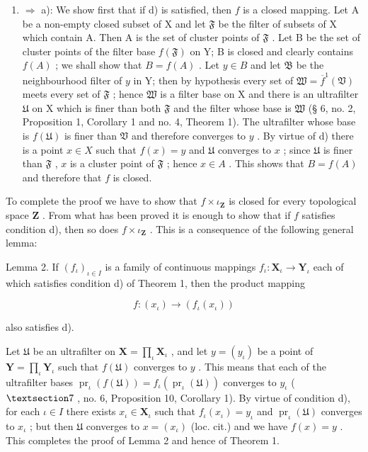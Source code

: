 \begin{enumerate}
\def\labelenumi{\alph{enumi})}
\setcounter{enumi}{3}
\tightlist
\item
  \(\Longrightarrow\) a): We show first that if d) is satisfied, then \(f\) is a closed mapping. Let A be a non-empty closed subset of X and let \(\mathfrak{F}\) be the filter of subsets of X which contain A. Then A is the set of cluster points of \(\mathfrak{F}\) . Let B be the set of cluster points of the filter base \(f(\mathfrak{F})\) on Y; B is closed and clearly contains \(f(A)\) ; we shall show that \(B = f(A)\) . Let \(y \in B\) and let \(\mathfrak{B}\) be the neighbourhood filter of \(y\) in Y; then by hypothesis every set of \(\mathfrak{W} = \overline{f}^{1}(\mathfrak{V})\) meets every set of \(\mathfrak{F}\) ; hence \(\mathfrak{W}\) is a filter base on X and there is an ultrafilter \(\mathfrak{U}\) on X which is finer than both \(\mathfrak{F}\) and the filter whose base is \(\mathfrak{W}\) (§ 6, no. 2, Proposition 1, Corollary 1 and no. 4, Theorem 1). The ultrafilter whose base is \(f(\mathfrak{U})\) is finer than \(\mathfrak{V}\) and therefore converges to \(y\) . By virtue of d) there is a point \(x \in X\) such that \(f(x) = y\) and \(\mathfrak{U}\) converges to \(x\) ; since \(\mathfrak{U}\) is finer than \(\mathfrak{F}\) , \(x\) is a cluster point of \(\mathfrak{F}\) ; hence \(x \in A\) . This shows that \(B = f(A)\) and therefore that \(f\) is closed.
\end{enumerate}

To complete the proof we have to show that \(f \times \iota_{\mathbf{Z}}\) is closed for every topological space \(\mathbf{Z}\) . From what has been proved it is enough to show that if \(f\) satisfies condition d), then so does \(f \times \iota_{\mathbf{Z}}\) . This is a consequence of the following general lemma:

Lemma 2. If \((f_{\iota})_{\iota\in I}\) is a family of continuous mappings \(f_{\iota}:\mathbf{X}_{\iota}\to \mathbf{Y}_{\iota}\) each of which satisfies condition d) of Theorem 1, then the product mapping

\[
f: (x _ {\iota}) \rightarrow (f _ {\iota} (x _ {\iota}))
\]

also satisfies d).

Let \(\mathfrak{U}\) be an ultrafilter on \(\mathbf{X} = \prod_{\iota} \mathbf{X}_{\iota}\) , and let \(y = (y_{\iota})\) be a point of \(\mathbf{Y} = \prod_{\iota} \mathbf{Y}_{\iota}\) such that \(f(\mathfrak{U})\) converges to \(y\) . This means that each of the ultrafilter bases \(\operatorname{pr}_{\iota}(f(\mathfrak{U})) = f_{\iota} (\operatorname{pr}_{\iota}(\mathfrak{U}))\) converges to \(y_{\iota}\) ( \(\S 7\) , no. 6, Proposition 10, Corollary 1). By virtue of condition d), for each \(\iota \in I\) there exists \(x_{\iota} \in \mathbf{X}_{\iota}\) such that \(f_{\iota}(x_{\iota}) = y_{\iota}\) and \(\operatorname{pr}_{\iota}(\mathfrak{U})\) converges to \(x_{\iota}\) ; but then \(\mathfrak{U}\) converges to \(x = (x_{\iota})\) (loc. cit.) and we have \(f(x) = y\) . This completes the proof of Lemma 2 and hence of Theorem 1.

